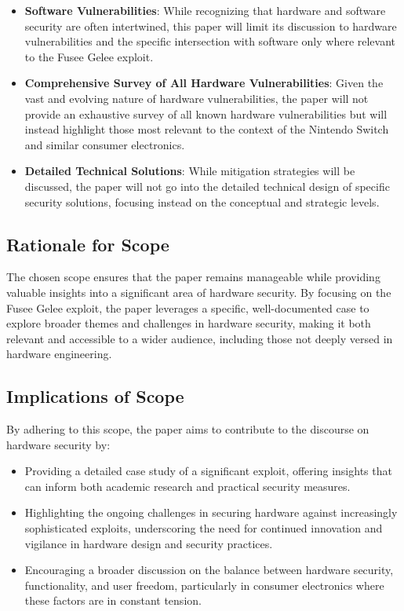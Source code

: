 \begin{itemize}
\item
  \textbf{Software Vulnerabilities}: While recognizing that hardware and
  software security are often intertwined, this paper will limit its
  discussion to hardware vulnerabilities and the specific intersection
  with software only where relevant to the Fusee Gelee exploit.
\item
  \textbf{Comprehensive Survey of All Hardware Vulnerabilities}: Given
  the vast and evolving nature of hardware vulnerabilities, the paper
  will not provide an exhaustive survey of all known hardware
  vulnerabilities but will instead highlight those most relevant to the
  context of the Nintendo Switch and similar consumer electronics.
\item
  \textbf{Detailed Technical Solutions}: While mitigation strategies
  will be discussed, the paper will not go into the detailed
  technical design of specific security solutions, focusing instead on
  the conceptual and strategic levels.
\end{itemize}

\hypertarget{rationale-for-scope}{%
\subsection{Rationale for Scope}\label{rationale-for-scope}}

The chosen scope ensures that the paper remains manageable while
providing valuable insights into a significant area of hardware
security. By focusing on the Fusee Gelee exploit, the paper leverages a
specific, well-documented case to explore broader themes and challenges
in hardware security, making it both relevant and accessible to a wider
audience, including those not deeply versed in hardware engineering.

\hypertarget{implications-of-scope}{%
\subsection{Implications of Scope}\label{implications-of-scope}}

By adhering to this scope, the paper aims to contribute to the
discourse on hardware security by:

\begin{itemize}
\item
  Providing a detailed case study of a significant exploit, offering
  insights that can inform both academic research and practical security
  measures.
\item
  Highlighting the ongoing challenges in securing hardware against
  increasingly sophisticated exploits, underscoring the need for
  continued innovation and vigilance in hardware design and security
  practices.
\item
  Encouraging a broader discussion on the balance between hardware
  security, functionality, and user freedom, particularly in consumer
  electronics where these factors are in constant tension.
\end{itemize}

